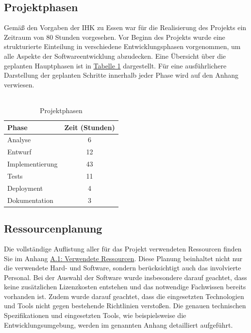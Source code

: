 \documentclass[a4paper,12pt]{article}
\begin{document}
\subsection{Projektphasen}
Gemäß den Vorgaben der IHK zu Essen war für die Realisierung des Projekts ein Zeitraum von 80 Stunden vorgesehen. Vor Beginn des Projekts wurde eine strukturierte Einteilung in verschiedene Entwicklungsphasen vorgenommen, um alle Aspekte der Softwareentwicklung abzudecken. Eine Übersicht über die geplanten Hauptphasen ist in  \hyperlink{Projektphasen}{Tabelle 1} dargestellt. Für eine ausführlichere Darstellung der geplanten Schritte innerhalb jeder Phase wird auf den Anhang verwiesen.\\
\\

\hypertarget{Projektphasen}{}
\begin{table}[h]
\centering
\begin{tabularx}{\textwidth}{|X|c|}
    \hline
    \rowcolor{gray}\textbf{Phase} & \textbf{Zeit (Stunden)} \\
    \hline
    Analyse & 6 \\
    \hline
    Entwurf & 12 \\
    \hline
    Implementierung & 43 \\
    \hline
    Tests & 11 \\
    \hline
    Deployment & 4 \\
    \hline
    Dokumentation & 3 \\
    \hline
\end{tabularx}
\caption{Projektphasen}
\label{tab:Projektphasen}
\end{table}

\subsection{Ressourcenplanung}
\label{sec:ressourcenplanung}
Die vollständige Auflistung aller für das Projekt verwendeten Ressourcen finden Sie im Anhang \hyperref[sec:ressourcen]{A.1: Verwendete Ressourcen}. Diese Planung beinhaltet nicht nur die verwendete Hard- und Software, sondern berücksichtigt auch das involvierte Personal. Bei der Auswahl der Software wurde insbesondere darauf geachtet, dass keine zusätzlichen Lizenzkosten entstehen und das notwendige Fachwissen bereits vorhanden ist. Zudem wurde darauf geachtet, dass die eingesetzten Technologien und Tools nicht gegen bestehende Richtlinien verstoßen. Die genauen technischen Spezifikationen und eingesetzten Tools, wie beispielsweise die Entwicklungsumgebung, werden im genannten Anhang detailliert aufgeführt.
\end{document}
